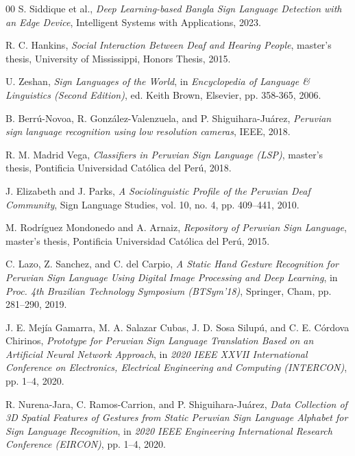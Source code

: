 \documentclass[preprint,12pt,authoryear]{elsarticle}
\begin{document}
\begin{thebibliography}{00}
S. Siddique et al., 
\textit{Deep Learning-based Bangla Sign Language Detection with an Edge Device}, 
Intelligent Systems with Applications, 2023.

R. C. Hankins, 
\textit{Social Interaction Between Deaf and Hearing People}, 
master's thesis, University of Mississippi, Honors Thesis, 2015.

U. Zeshan, 
\textit{Sign Languages of the World}, 
in \textit{Encyclopedia of Language \& Linguistics (Second Edition)}, 
ed. Keith Brown, Elsevier, pp. 358-365, 2006.

B. Berrú-Novoa, R. González-Valenzuela, and P. Shiguihara-Juárez, 
\textit{Peruvian sign language recognition using low resolution cameras}, 
IEEE, 2018.

R. M. Madrid Vega, 
\textit{Classifiers in Peruvian Sign Language (LSP)}, 
master's thesis, Pontificia Universidad Católica del Perú, 2018.

J. Elizabeth and J. Parks, 
\textit{A Sociolinguistic Profile of the Peruvian Deaf Community}, 
Sign Language Studies, vol. 10, no. 4, pp. 409--441, 2010.

M. Rodríguez Mondonedo and A. Arnaiz, 
\textit{Repository of Peruvian Sign Language}, 
master's thesis, Pontificia Universidad Católica del Perú, 2015.

C. Lazo, Z. Sanchez, and C. del Carpio, 
\textit{A Static Hand Gesture Recognition for Peruvian Sign Language Using Digital Image Processing and Deep Learning}, 
in \textit{Proc. 4th Brazilian Technology Symposium (BTSym'18)}, Springer, Cham, pp. 281--290, 2019.

J. E. Mejía Gamarra, M. A. Salazar Cubas, J. D. Sosa Silupú, and C. E. Córdova Chirinos, 
\textit{Prototype for Peruvian Sign Language Translation Based on an Artificial Neural Network Approach}, 
in \textit{2020 IEEE XXVII International Conference on Electronics, Electrical Engineering and Computing (INTERCON)}, pp. 1--4, 2020.

R. Nurena-Jara, C. Ramos-Carrion, and P. Shiguihara-Juárez, 
\textit{Data Collection of 3D Spatial Features of Gestures from Static Peruvian Sign Language Alphabet for Sign Language Recognition}, 
in \textit{2020 IEEE Engineering International Research Conference (EIRCON)}, pp. 1--4, 2020.


\end{thebibliography}
\end{document}
